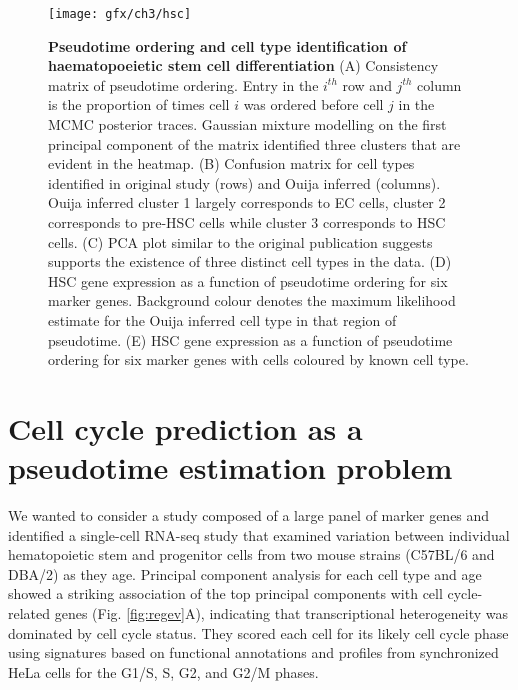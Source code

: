 \begin{figure}
	\centering
	\texttt{[image: gfx/ch3/hsc]}
	\caption{{\bf Pseudotime ordering and cell type identification of haematopoeietic stem cell differentiation}
(A) Consistency matrix of pseudotime ordering. Entry in the $i^{th}$ row and $j^{th}$ column is the proportion of times cell $i$ was ordered before cell $j$ in the MCMC posterior traces. Gaussian mixture modelling on the first principal component of the matrix identified three clusters that are evident in the heatmap.
(B) Confusion matrix for cell types identified in original study (rows) and Ouija inferred (columns). Ouija inferred cluster 1 largely corresponds to EC cells, cluster 2 corresponds to pre-HSC cells while cluster 3 corresponds to HSC cells.
(C) PCA plot similar to the original publication \cite{zhou2016tracing} suggests supports the existence of three distinct cell types in the data.
(D) HSC gene expression as a function of pseudotime ordering for six marker genes. Background colour denotes the maximum likelihood estimate for the Ouija inferred cell type in that region of pseudotime.
(E) HSC gene expression as a function of pseudotime ordering for six marker genes with cells coloured by known cell type.
}
	\label{fig:hsc}
\end{figure}


\section{Cell cycle prediction as a pseudotime estimation problem}

We wanted to consider a study composed of a large panel of marker genes and identified a single-cell RNA-seq study \cite{Kowalczyk2015-li} that examined variation between individual hematopoietic stem and progenitor cells from two mouse strains (C57BL/6 and DBA/2) as they age. Principal component analysis for each cell type and age showed a striking association of the top principal components with cell cycle-related genes (Fig. \ref{fig:regev}A), indicating that transcriptional heterogeneity was dominated by cell cycle status. They scored each cell for its likely cell cycle phase using signatures based on functional annotations \cite{reference2009gene} and profiles from synchronized HeLa cells\cite{whitfield2002identification} for the G1/S, S, G2, and G2/M phases.

